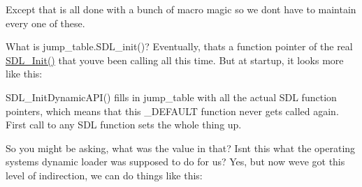 \begin{DoxyCode}{0}
\DoxyCodeLine{\{}
\DoxyCodeLine{\}}

\end{DoxyCode}


Except that is all done with a bunch of macro magic so we don\textquotesingle{}t have to maintain every one of these.

What is jump\+\_\+table.\+SDL\+\_\+init()? Eventually, that\textquotesingle{}s a function pointer of the real \mbox{\hyperlink{_s_d_l_8h_a8fc8d35348d7c74bad8392d776c937b8}{SDL\+\_\+\+Init()}} that you\textquotesingle{}ve been calling all this time. But at startup, it looks more like this\+:


\begin{DoxyCode}{0}
\DoxyCodeLine{\{}
\DoxyCodeLine{\}}

\end{DoxyCode}


SDL\+\_\+\+Init\+Dynamic\+API() fills in jump\+\_\+table with all the actual SDL function pointers, which means that this {\ttfamily \+\_\+\+DEFAULT} function never gets called again. First call to any SDL function sets the whole thing up.

So you might be asking, what was the value in that? Isn\textquotesingle{}t this what the operating system\textquotesingle{}s dynamic loader was supposed to do for us? Yes, but now we\textquotesingle{}ve got this level of indirection, we can do things like this\+:


\begin{DoxyCode}{0}

\end{DoxyCode}


